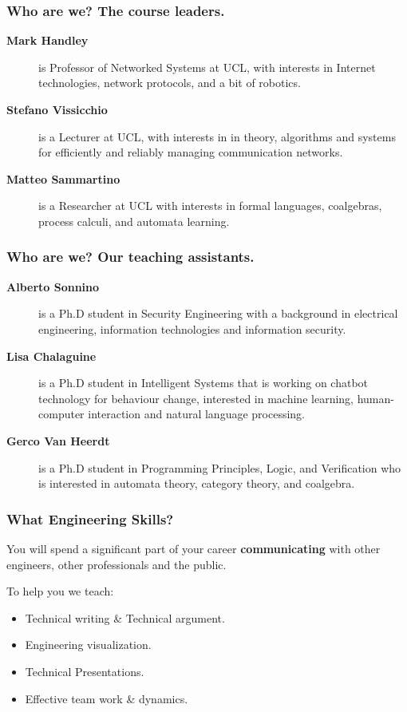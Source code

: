 \documentclass{beamer} %
\newcommand\emc[1]{\textcolor{midred}{\textbf{#1}}}
\begin{document}
\begin{frame}
\frametitle{Who are we? The course leaders.} 

\begin{description}
\item[{\bf Mark Handley}] is Professor of Networked Systems at UCL, with interests in Internet technologies, network protocols, and a bit of robotics.
\item[{\bf Stefano Vissicchio}] is a Lecturer at UCL, with interests in in theory, algorithms and systems for efficiently and reliably managing communication networks.
\item[{\bf Matteo Sammartino}] is a Researcher at UCL with interests in formal languages, coalgebras, process calculi, and automata learning.
\end{description}

\end{frame}

\begin{frame}
\frametitle{Who are we? Our teaching assistants.} 

\begin{description}
\item[{\bf Alberto Sonnino}] is a Ph.D student in Security Engineering with a background in electrical engineering, information technologies and information security.
\item[{\bf Lisa Chalaguine}] is a Ph.D student in Intelligent Systems that is working on chatbot technology for behaviour change, interested in machine learning, human-computer interaction and natural language processing. 
\item[{\bf Gerco Van Heerdt}] is a Ph.D student in Programming Principles, Logic, and Verification who is interested in automata theory, category theory, and coalgebra.
\end{description}

\end{frame}


\begin{frame}
\frametitle{What Engineering Skills?} 

You will spend a significant part of your career \emc{communicating} with other engineers, other professionals and the public.

\vspace{3mm}
To help you we teach:
\begin{itemize}
\item Technical writing \& Technical argument.
\item Engineering visualization.
\item Technical Presentations.
\item Effective team work \& dynamics.
\end{itemize}
\end{frame}
\end{document}
